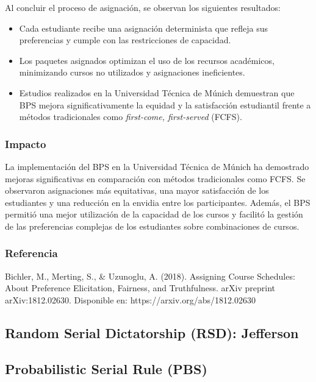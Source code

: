 \documentclass{article}
\begin{document}
Al concluir el proceso de asignación, se observan los siguientes resultados:

\begin{itemize}
    \item Cada estudiante recibe una asignación determinista que refleja sus preferencias y cumple con las restricciones de capacidad.
    
    \item Los paquetes asignados optimizan el uso de los recursos académicos, minimizando cursos no utilizados y asignaciones ineficientes.

    \item Estudios realizados en la Universidad Técnica de Múnich demuestran que BPS mejora significativamente la equidad y la satisfacción estudiantil frente a métodos tradicionales como \textit{first-come, first-served} (FCFS).
\end{itemize}

\subsubsection{Impacto}

La implementación del BPS en la Universidad Técnica de Múnich ha demostrado mejoras significativas en comparación con métodos tradicionales como FCFS. Se observaron asignaciones más equitativas, una mayor satisfacción de los estudiantes y una reducción en la envidia entre los participantes. Además, el BPS permitió una mejor utilización de la capacidad de los cursos y facilitó la gestión de las preferencias complejas de los estudiantes sobre combinaciones de cursos.

\subsubsection{Referencia}

Bichler, M., Merting, S., & Uzunoglu, A. (2018). Assigning Course Schedules: About Preference Elicitation, Fairness, and Truthfulness. arXiv preprint arXiv:1812.02630. Disponible en: https://arxiv.org/abs/1812.02630

\subsection{Random Serial Dictatorship (RSD): Jefferson}

\subsection{Probabilistic Serial Rule (PBS)}
\end{document}
